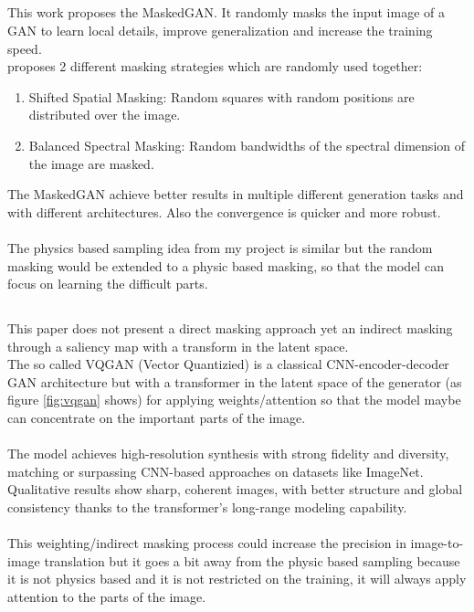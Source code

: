 		\subsection{}
			This work proposes the MaskedGAN. It randomly masks the input image of a GAN to learn local details, improve generalization and increase the training speed. \\
			\citeauthor{huang_masked_2022} proposes 2 different masking strategies which are randomly used together:
			\begin{enumerate}
				\item Shifted Spatial Masking: Random squares with random positions are distributed over the image.
				\item Balanced Spectral Masking: Random bandwidths of the spectral dimension of the image are masked.
			\end{enumerate}
			The MaskedGAN achieve better results in multiple different generation tasks and with different architectures. Also the convergence is quicker and more robust.\\
			\\
			The physics based sampling idea from my project is similar but the random masking would be extended to a physic based masking, so that the model can focus on learning the difficult parts. 
			
		\subsection{}
			This paper does not present a direct masking approach yet an indirect masking through a saliency map with a transform in the latent space.\\
			The so called VQGAN (Vector Quantizied) is a classical CNN-encoder-decoder GAN architecture but with a transformer in the latent space of the generator (as figure \ref{fig:vqgan} shows) for applying weights/attention so that the model maybe can concentrate on the important parts of the image.\\
			\\
			The model achieves high-resolution synthesis with strong fidelity and diversity, matching or surpassing CNN-based approaches on datasets like ImageNet. Qualitative results show sharp, coherent images, with better structure and global consistency thanks to the transformer’s long-range modeling capability.\\
			\\
			This weighting/indirect masking process could increase the precision in image-to-image translation but it goes a bit away from the physic based sampling because it is not physics based and it is not restricted on the training, it will always apply attention to the parts of the image.
			
